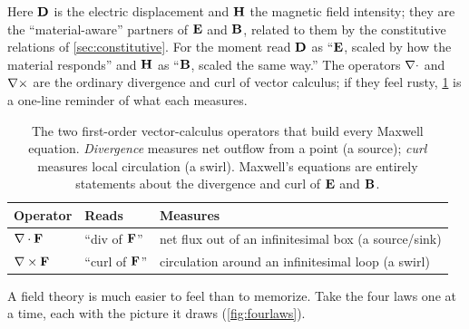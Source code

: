 Here $\mathbf{D}$ is the electric displacement and $\mathbf{H}$ the magnetic field intensity;
they are the ``material-aware'' partners of $\mathbf{E}$ and $\mathbf{B}$, related to them by
the constitutive relations of \cref{sec:constitutive}. For the moment read
$\mathbf{D}$ as ``$\mathbf{E}$, scaled by how the material responds'' and $\mathbf{H}$ as
``$\mathbf{B}$, scaled the same way.'' The operators $\nabla\cdot$ and $\nabla\times$ are the
ordinary divergence and curl of vector calculus; if they feel rusty,
\cref{tab:vectorcalc} is a one-line reminder of what each measures.

\begin{table}[t]
\centering
\caption[The two derivative operators]{The two first-order vector-calculus
operators that build every Maxwell equation. \emph{Divergence} measures
net outflow from a point (a source); \emph{curl} measures local circulation
(a swirl). Maxwell's equations are entirely statements about the divergence
and curl of $\mathbf{E}$ and $\mathbf{B}$.}
\label{tab:vectorcalc}
\small
\setlength{\tabcolsep}{6pt}
\renewcommand{\arraystretch}{1.25}
\begin{tabular}{@{}lll@{}}
\toprule
Operator & Reads & Measures \\
\midrule
$\nabla\cdot \mathbf{F}$ & ``div of $\mathbf{F}$'' & net flux out of an infinitesimal box (a source/sink) \\
$\nabla\times \mathbf{F}$ & ``curl of $\mathbf{F}$'' & circulation around an infinitesimal loop (a swirl) \\
\bottomrule
\end{tabular}
\end{table}

A field theory is much easier to feel than to memorize. Take the four laws one
at a time, each with the picture it draws (\cref{fig:fourlaws}).

